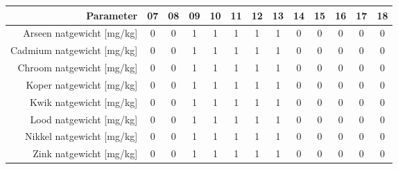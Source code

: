 \begin{tabular}{ r |c | c | c | c | c |c | c | c | c | c | c | c } 
\rowcolor[HTML]{EFEFEF}  
 Parameter & 07 & 08 & 09 & 10 & 11 & 12 & 13 & 14 & 15 & 16 & 17 & 18 \\    \hline     
Arseen natgewicht [mg/kg] &0 & 0 & 1 & 1 & 1 & 1 & 1 & 0 & 0 & 0 & 0 & 0 \\
Cadmium natgewicht [mg/kg] &0 & 0 & 1 & 1 & 1 & 1 & 1 & 0 & 0 & 0 & 0 & 0 \\
Chroom natgewicht [mg/kg] &0 & 0 & 1 & 1 & 1 & 1 & 1 & 0 & 0 & 0 & 0 & 0 \\
Koper natgewicht [mg/kg] &0 & 0 & 1 & 1 & 1 & 1 & 1 & 0 & 0 & 0 & 0 & 0 \\
Kwik natgewicht [mg/kg] &0 & 0 & 1 & 1 & 1 & 1 & 1 & 0 & 0 & 0 & 0 & 0 \\
Lood natgewicht [mg/kg] &0 & 0 & 1 & 1 & 1 & 1 & 1 & 0 & 0 & 0 & 0 & 0 \\
Nikkel natgewicht [mg/kg] &0 & 0 & 1 & 1 & 1 & 1 & 1 & 0 & 0 & 0 & 0 & 0 \\
Zink natgewicht [mg/kg] &0 & 0 & 1 & 1 & 1 & 1 & 1 & 0 & 0 & 0 & 0 & 0 \\
\end{tabular}    
